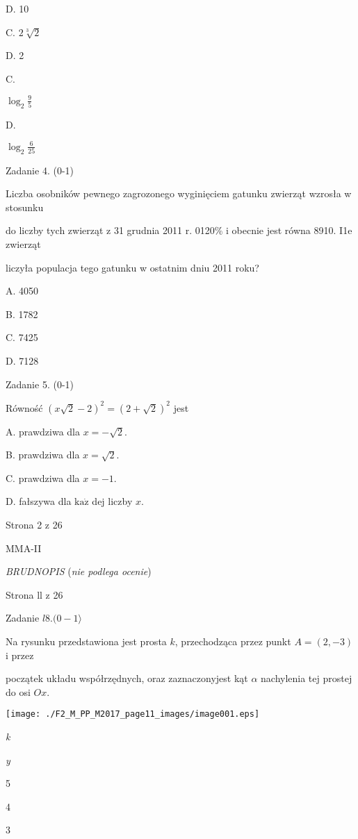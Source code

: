 \documentclass[a4paper,12pt]{article}
\begin{document}
D. 10

C. $2\sqrt[3]{2}$

D. 2

C.

$\log_{2} \displaystyle \frac{9}{5}$

D.

$\displaystyle \log_{2}\frac{6}{25}$

Zadanie 4. (0-1)

Liczba osobników pewnego zagrozonego wyginięciem gatunku zwierząt wzrosła w stosunku

do liczby tych zwierząt z 31 grudnia 2011 r. 0120\% i obecnie jest równa 8910. I1e zwierząt

liczyła populacja tego gatunku w ostatnim dniu 2011 roku?

A. 4050

B. 1782

C. 7425

D. 7128

Zadanie 5. (0-1)

Równość $(x\sqrt{2}-2)^{2}=(2+\sqrt{2})^{2}$ jest

A. prawdziwa dla $x=-\sqrt{2}.$

B. prawdziwa dla $x=\sqrt{2}.$

C. prawdziwa dla $x=-1.$

D. fałszywa dla $\mathrm{k}\mathrm{a}\dot{\mathrm{z}}$ dej liczby $x.$

Strona 2 z 26

MMA-II





{\it BRUDNOPIS} ({\it nie podlega ocenie})

Strona ll z 26





Zadanie $l8. (0-1\rangle$

Na rysunku przedstawiona jest prosta $k$, przechodząca przez punkt $A=(2,-3)$ i przez

początek układu współrzędnych, oraz zaznaczonyjest kąt $\alpha$ nachylenia tej prostej do osi $Ox.$
\begin{center}
\texttt{[image: ./F2\_M\_PP\_M2017\_page11\_images/image001.eps]}
\end{center}
{\it k}

{\it y}

5

4

3
\end{document}
